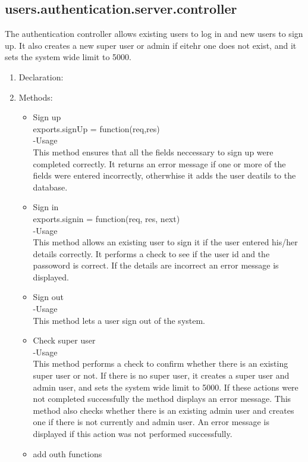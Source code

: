 \documentclass[a4paper,12pt]{article}
\begin{document}
\subsection{users.authentication.server.controller}
 The authentication controller allows existing users to log in and new users to sign up. It also creates a new super user or admin if eitehr one does not exist, and it sets the system wide limit to 5000.
\begin{enumerate}
\item Declaration:
\item Methods:
	\begin{itemize}
	\item Sign up\\
  	exports.signUp = function(req,res)\\
  	-Usage\\
  	This method ensures that all the fields neccessary to sign up were completed correctly. It returns an error message if one or 	more of the fields were entered incorrectly, otherwhise it adds the user deatils to the database.
 	 \item Sign in\\
	exports.signin = function(req, res, next) \\
	-Usage\\
	This method allows an existing user to sign it if the user entered his/her details correctly. It performs a check to see if the user 	id and the passoword is correct. If the details are incorrect an error message is displayed.
	\item Sign out\\
	-Usage\\
	This method lets a user sign out of the system.
 	 \item Check super user\\
 	 -Usage\\
  This method performs a check to confirm whether there is an existing super user or not. If there is no super user, it creates a super user and admin user, and sets the system wide limit to 5000. If these actions were not completed successfully the method displays an error message. This method also checks whether there is an existing admin user and creates one if there is not currently and admin user. An error message is displayed if this action was not performed successfully.
  
  \item add outh functions
	\end{itemize}
\end{enumerate}
\end{document}
